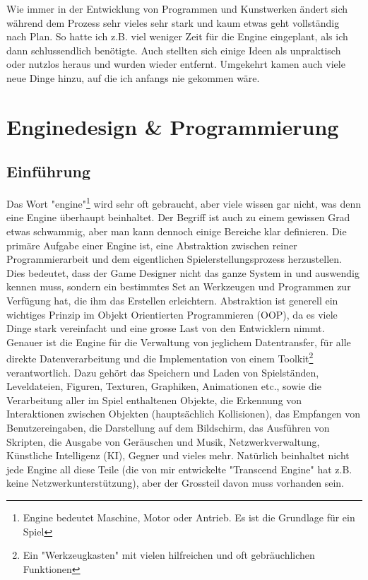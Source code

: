 \documentclass[12pt,a4paper,titlepage]{article}
\begin{document}
		Wie immer in der Entwicklung von Programmen und Kunstwerken ändert sich während dem Prozess sehr vieles sehr stark und kaum etwas geht vollständig nach Plan. So hatte ich z.B. viel weniger Zeit für die Engine eingeplant, als ich dann schlussendlich benötigte. Auch stellten sich einige Ideen als unpraktisch oder nutzlos heraus und wurden wieder entfernt. Umgekehrt kamen auch viele neue Dinge hinzu, auf die ich anfangs nie gekommen wäre.\\
		

\section{Enginedesign \& Programmierung}
	\subsection{Einführung}
		Das Wort "engine"\footnote{Engine bedeutet Maschine, Motor oder Antrieb. Es ist die Grundlage für ein Spiel} wird sehr oft gebraucht, aber viele wissen gar nicht, was denn eine Engine überhaupt beinhaltet. Der Begriff ist auch zu einem gewissen Grad etwas schwammig, aber man kann dennoch einige Bereiche klar definieren. Die primäre Aufgabe einer Engine ist, eine Abstraktion zwischen reiner Programmierarbeit und dem eigentlichen Spielerstellungsprozess herzustellen. Dies bedeutet, dass der Game Designer nicht das ganze System in und auswendig kennen muss, sondern ein bestimmtes Set an Werkzeugen und Programmen zur Verfügung hat, die ihm das Erstellen erleichtern. Abstraktion ist generell ein wichtiges Prinzip im Objekt Orientierten Programmieren (OOP), da es viele Dinge stark vereinfacht und eine grosse Last von den Entwicklern nimmt.\\
		
		Genauer ist die Engine für die Verwaltung von jeglichem Datentransfer, für alle direkte Datenverarbeitung und die Implementation von einem Toolkit\footnote{Ein "Werkzeugkasten" mit vielen hilfreichen und oft gebräuchlichen Funktionen} verantwortlich. Dazu gehört das Speichern und Laden von Spielständen, Leveldateien, Figuren, Texturen, Graphiken, Animationen etc., sowie die Verarbeitung aller im Spiel enthaltenen Objekte, die Erkennung von Interaktionen zwischen Objekten (hauptsächlich Kollisionen), das Empfangen von Benutzereingaben, die Darstellung auf dem Bildschirm, das Ausführen von Skripten, die Ausgabe von Geräuschen und Musik, Netzwerkverwaltung, Künstliche Intelligenz (KI), Gegner und vieles mehr. Natürlich beinhaltet nicht jede Engine all diese Teile (die von mir entwickelte "Transcend Engine" hat z.B. keine Netzwerkunterstützung), aber der Grossteil davon muss vorhanden sein.\\
		
\end{document}
